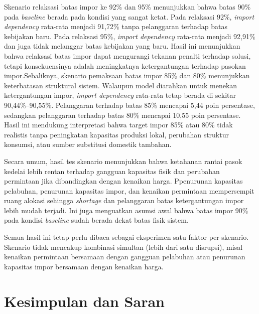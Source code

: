 \documentclass{file/TA-ITS}
\theoremstyle{definition}
\theoremstyle{definition}
\theoremstyle{plain}
\begin{document}

Skenario relaksasi batas impor ke 92\% dan 95\% menunjukkan bahwa batas 90\% pada \textit{baseline} berada pada kondisi yang sangat ketat. Pada relaksasi 92\%, \textit{import dependency} rata-rata menjadi 91{,}72\% tanpa pelanggaran terhadap batas kebijakan baru. Pada relaksasi 95\%, \textit{import dependency} rata-rata menjadi 92{,}91\% dan juga tidak melanggar batas kebijakan yang baru. Hasil ini menunjukkan bahwa relaksasi batas impor dapat mengurangi tekanan penalti terhadap solusi, tetapi konsekuensinya adalah meningkatnya ketergantungan terhadap pasokan impor.Sebaliknya, skenario pemaksaan batas impor 85\% dan 80\% menunjukkan keterbatasan struktural sistem. Walaupun model diarahkan untuk menekan ketergantungan impor, \textit{import dependency} rata-rata tetap berada di sekitar 90{,}44\%--90{,}55\%. Pelanggaran terhadap batas 85\% mencapai 5{,}44 poin persentase, sedangkan pelanggaran terhadap batas 80\% mencapai 10{,}55 poin persentase. Hasil ini mendukung interpretasi bahwa target impor 85\% atau 80\% tidak realistis tanpa peningkatan kapasitas produksi lokal, perubahan struktur konsumsi, atau sumber substitusi domestik tambahan.

Secara umum, hasil tes skenario menunjukkan bahwa ketahanan rantai pasok kedelai lebih rentan terhadap gangguan kapasitas fisik dan perubahan permintaan jika dibandingkan dengan kenaikan harga. Ppenurunan kapasitas pelabuhan, penurunan kapasitas impor, dan kenaikan permintaan mempersempit ruang alokasi sehingga \textit{shortage} dan pelanggaran batas ketergantungan impor lebih mudah terjadi. Ini juga menguatkan asumsi awal bahwa batas impor 90\% pada kondisi \textit{baseline} sudah berada dekat batas fisik sistem.

Semua hasil ini tetap perlu dibaca sebagai eksperimen satu faktor per-skenario. Skenario tidak mencakup kombinasi simultan (lebih dari satu disrupsi), misal kenaikan permintaan bersamaan dengan gangguan pelabuhan atau penurunan kapasitas impor bersamaan dengan kenaikan harga.


\chapter{Kesimpulan dan Saran}
\end{document}
